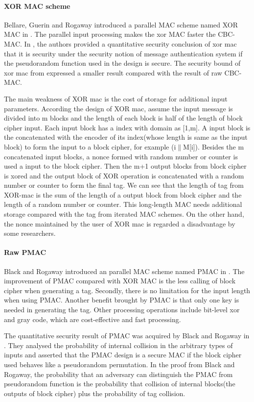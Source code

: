 \documentclass{article}
\begin{document}
\paragraph{XOR MAC scheme}
Bellare, Guerin and Rogaway introduced a parallel MAC scheme named XOR MAC in \cite{xor-mac}. 
The parallel input processing makes the xor MAC faster the CBC-MAC. 
In \cite{xor-mac}, the authors provided a quantitative security conclusion of xor mac that it is security under the security notion of message authentication system if the pseudorandom function used in the design is secure. The security bound of xor mac from \cite{xor-mac} expressed a smaller result compared with the result of raw CBC-MAC. 

The main weakness of XOR mac is the cost of storage for additional input parameters. According the design of XOR mac, assume the input message is divided into m blocks and the length of each block is half of the length of block cipher input. Each input block has a index with domain as [1,m]. A input block is the concatenated with the encoder of its index(whose length is same as the input block) to form the input to a block cipher, for example (i$\|$M[i]). Besides the m concatenated input blocks, a nonce formed with random number or counter is used a input to the block cipher. Then the m+1 output blocks from block cipher is xored and the output block of XOR operation is concatenated with a random number or counter to form the final tag. 
We can see that the length of tag from XOR-mac is the sum of the length of a output block from block cipher and the length of a random number or counter. This long-length MAC needs additional storage compared with the tag from iterated MAC schemes. 
On the other hand, the nonce maintained by the user of XOR mac is regarded a disadvantage by some researchers.

\paragraph{Raw PMAC}
Black and Rogaway introduced an parallel MAC scheme named PMAC in \cite{pmac}. 
The improvement of PMAC compared with XOR MAC is the less calling of block cipher when generating a tag. Secondly, there is no limitation for the input length when using PMAC. 
Another benefit brought by PMAC is that only one key is needed in generating the tag. Other processing operations include bit-level xor and gray code, which are cost-effective and fast processing. 

The quantitative security result of PMAC was acquired by Black and Rogaway in \cite{pmac}. They analysed the probability of internal collision in the arbitrary types of inputs and asserted that the PMAC design is a secure MAC if the block cipher used behaves like a pseudorandom permutation. In the proof from Black and Rogaway, the probability that an adversary can distinguish the PMAC from pseudorandom function is the probability that collision of internal blocks(the outputs of block cipher) plus the probability of tag collision. 
\end{document}
